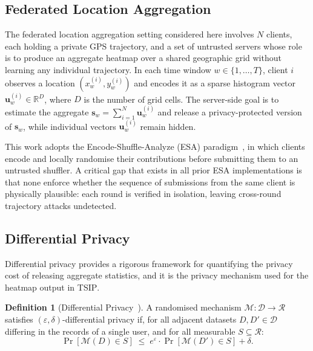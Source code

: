 \documentclass[conference]{IEEEtran}
\theoremstyle{definition}
\newtheorem{definition}{Definition}
\theoremstyle{plain}
\begin{document}
\subsection{Federated Location Aggregation}\label{sec:prelim-fl}

The federated location aggregation setting considered here involves
$N$ clients, each holding a private GPS trajectory, and a set of
untrusted servers whose role is to produce an aggregate heatmap over
a shared geographic grid without learning any individual trajectory.
In each time window $w \in \{1, \ldots, T\}$, client $i$ observes
a location $(x_w^{(i)}, y_w^{(i)})$ and encodes it as a sparse
histogram vector $\mathbf{u}_w^{(i)} \in \mathbb{R}^D$, where $D$
is the number of grid cells.
The server-side goal is to estimate the aggregate
$\mathbf{s}_w = \sum_{i=1}^{N} \mathbf{u}_w^{(i)}$
and release a privacy-protected version of $\mathbf{s}_w$, while
individual vectors $\mathbf{u}_w^{(i)}$ remain hidden.

This work adopts the Encode-Shuffle-Analyze (ESA)
paradigm~\cite{Balle2019privacy,Cheu2019distributed}, in which
clients encode and locally randomise their contributions before
submitting them to an untrusted shuffler.
A critical gap that exists in all prior ESA implementations is that
none enforce whether the sequence of submissions from the same client
is physically plausible: each round is verified in isolation, leaving
cross-round trajectory attacks undetected.

\subsection{Differential Privacy}\label{sec:prelim-dp}

Differential privacy provides a rigorous framework for quantifying
the privacy cost of releasing aggregate statistics, and it is the
privacy mechanism used for the heatmap output in \textsc{TSIP}.

\begin{definition}[Differential Privacy~\cite{Dwork2006calibrating}]
\label{def:dp}
A randomised mechanism $\mathcal{M}: \mathcal{D} \to \mathcal{R}$
satisfies $(\varepsilon, \delta)$-differential privacy if, for all
adjacent datasets $D, D' \in \mathcal{D}$ differing in the records
of a single user, and for all measurable $S \subseteq \mathcal{R}$:
\begin{equation}
  \Pr[\mathcal{M}(D) \in S]
  \;\leq\; e^{\varepsilon} \cdot \Pr[\mathcal{M}(D') \in S] + \delta.
\end{equation}
\end{definition}
\end{document}
